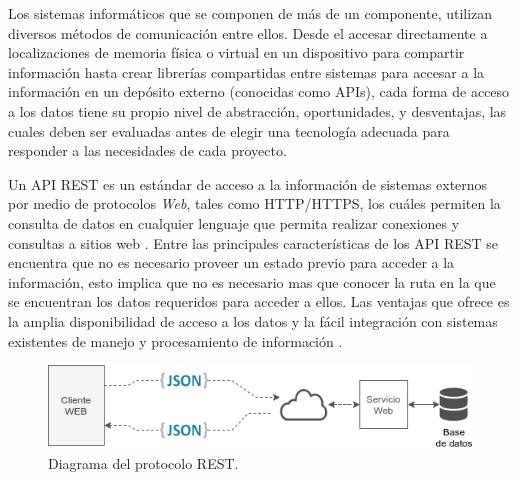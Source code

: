 



Los sistemas informáticos que se componen de más de un componente, utilizan diversos métodos de comunicación entre ellos. Desde el accesar directamente a localizaciones de memoria física o virtual en un dispositivo para compartir información hasta crear librerías compartidas entre sistemas para accesar a la información en un depósito externo (conocidas como APIs), cada forma de acceso a los datos tiene su propio nivel de abstracción, oportunidades, y desventajas, las cuales deben ser evaluadas antes de elegir una tecnología adecuada para responder a las necesidades de cada proyecto.


Un API REST es un estándar de acceso a la información de sistemas externos por medio de protocolos \textit{Web}, tales como HTTP/HTTPS, los cuáles permiten la consulta de datos en cualquier lenguaje que permita realizar conexiones y consultas a sitios web \cite{REST_API_design}. Entre las principales características de los API REST se encuentra que no es necesario proveer un estado previo para acceder a la información, esto implica que no es necesario mas que conocer la ruta en la que se encuentran los datos requeridos para acceder a ellos. Las ventajas que ofrece es la amplia disponibilidad de acceso a los datos y la fácil integración con sistemas existentes de manejo y procesamiento de información \cite{OpenAPI_example}.


\begin{figure}[!ht]
	\centering
	\includegraphics[width=.70\linewidth]{images/diagrams/REST.png}
	\caption{Diagrama del protocolo REST.}
	\label{fig:coms_nodos_raspberry}
\end{figure}

